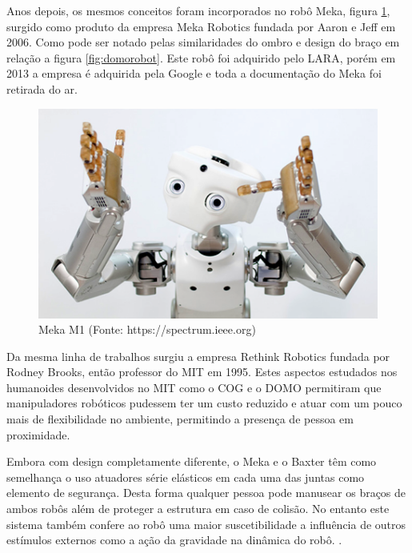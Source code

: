 Anos depois, os mesmos conceitos foram incorporados no robô Meka, figura \ref{fig:meka}, surgido como produto da empresa Meka Robotics fundada por Aaron e Jeff em 2006. Como pode ser notado pelas similaridades do ombro e design do braço em relação a figura \ref{fig:domorobot}. Este robô foi adquirido pelo LARA, porém em 2013 a empresa é adquirida pela Google e toda a documentação do Meka foi retirada do ar. 


\begin{figure}[H]
    \centering
    \includegraphics[width=0.6\linewidth]{tex/figs/meka-robot.png}
    \caption{Meka M1 (Fonte: https://spectrum.ieee.org)}
    \label{fig:meka}
\end{figure}

Da mesma linha de trabalhos surgiu a empresa Rethink Robotics fundada por Rodney Brooks, então professor do MIT em 1995. Estes aspectos estudados nos humanoides desenvolvidos no MIT como o COG e o DOMO permitiram que manipuladores robóticos pudessem ter um custo reduzido e atuar com um pouco mais de flexibilidade no ambiente, permitindo a presença de pessoa em proximidade.


Embora com design completamente diferente, o Meka e o Baxter têm como semelhança o uso atuadores série elásticos em cada uma das juntas como elemento de segurança. Desta forma qualquer pessoa pode manusear os braços de ambos robôs além de proteger a estrutura em caso de colisão\cite{pratt1995series}. No entanto este sistema também confere ao robô uma maior suscetibilidade a influência de outros estímulos externos como a ação da gravidade na dinâmica do robô. \cite{nobody}.

